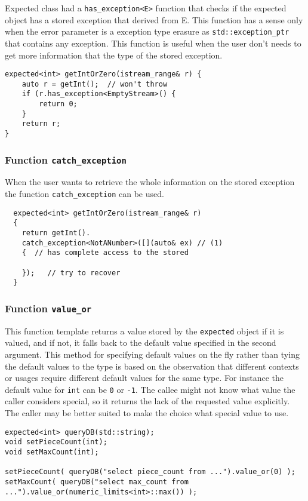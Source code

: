\documentclass[a4paper,10pt]{article}
\newcommand{\cpp}[1]{\lstinline{#1}}
\begin{document}
\cite{AlexandrescuExpected} Expected class had a \cpp{has_exception<E>} function that checks if the expected object has a stored exception that derived from E. This function has a sense only when the error parameter is a exception type erasure as \cpp{std::exception_ptr} that contains any exception. This function is useful when the user don't needs to get more information that the type of the stored exception.

\begin{lstlisting}
expected<int> getIntOrZero(istream_range& r) {
    auto r = getInt();  // won't throw
    if (r.has_exception<EmptyStream>() {
        return 0;
    }
    return r;
}
\end{lstlisting}


\subsubsection{Function \cpp{catch_exception}}

When the user wants to retrieve the whole information on the stored exception the function \cpp{catch_exception}  can be used.

\begin{lstlisting}
  expected<int> getIntOrZero(istream_range& r) 
  {
    return getInt().
    catch_exception<NotANumber>([](auto& ex) // (1)
    {  // has complete access to the stored 
  
    });   // try to recover
  }
\end{lstlisting}


\subsubsection{Function \cpp{value_or}}

This function template returns a value stored by the \cpp{expected} object if it is valued, and if not, it falls back to the default value specified in the second argument. This method for specifying default values on the fly rather than tying the default values to the type is based on the observation that different contexts or usages require different default values for the same type. For instance the default value for \cpp{int} can be \cpp{0} or \cpp{-1}. The callee might not know what value the caller considers special, so it returns the lack of the requested value explicitly. The caller may be better suited to make the choice what special value to use.

\begin{lstlisting}
expected<int> queryDB(std::string);
void setPieceCount(int);
void setMaxCount(int);

setPieceCount( queryDB("select piece_count from ...").value_or(0) );
setMaxCount( queryDB("select max_count from ...").value_or(numeric_limits<int>::max()) );
\end{lstlisting}
\end{document}
